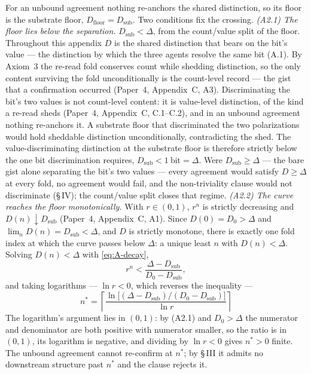 \documentclass[11pt,oneside]{report}
\theoremstyle{definition}
\theoremstyle{remark}
\begin{document}
For an unbound agreement nothing re-anchors the shared distinction, so its floor is the
substrate floor, \ensuremath{D_{\mathrm{floor}} = D_{\mathrm{sub}}}. Two conditions fix
the crossing.
\emph{(A2.1) The floor lies below the separation.} \ensuremath{D_{\mathrm{sub}} <
\Delta}, from the count/value split of the floor. Throughout this appendix
\ensuremath{D} is the shared distinction that bears on the bit's value --- the
distinction by which the three agents resolve the same bit (A.1). By Axiom~3 the
re-read fold conserves count while shedding distinction, so the only content surviving
the fold unconditionally is the count-level record --- the gist that a confirmation
occurred (Paper~4, Appendix~C, A3). Discriminating the bit's two values is not
count-level content: it is value-level distinction, of the kind a re-read sheds
(Paper~4, Appendix~C, C.1--C.2), and in an unbound agreement nothing re-anchors it. A
substrate floor that discriminated the two polarizations would hold sheddable
distinction unconditionally, contradicting the shed. The value-discriminating
distinction at the substrate floor is therefore strictly below the one bit
discrimination requires, \ensuremath{D_{\mathrm{sub}} < 1\ \text{bit} = \Delta}. Were
\ensuremath{D_{\mathrm{sub}} \geq \Delta} --- the bare gist alone separating the bit's
two values --- every agreement would satisfy \ensuremath{D \geq \Delta} at every fold,
no agreement would fail, and the non-triviality clause would not discriminate
(\S\,IV); the count/value split closes that regime.
\emph{(A2.2) The curve reaches the floor monotonically.} With \ensuremath{r \in (0,1)},
\ensuremath{r^{n}} is strictly decreasing and \ensuremath{D(n) \downarrow
D_{\mathrm{sub}}} (Paper~4, Appendix~C, A1). Since \ensuremath{D(0) = D_0 > \Delta} and
\ensuremath{\lim_{n} D(n) = D_{\mathrm{sub}} < \Delta}, and \ensuremath{D} is strictly
monotone, there is exactly one fold index at which the curve passes below
\ensuremath{\Delta}: a unique least \ensuremath{n} with \ensuremath{D(n) < \Delta}.
Solving \ensuremath{D(n) < \Delta} with \eqref{eq:A-decay},
\begin{equation}
r^{n} < \frac{\Delta - D_{\mathrm{sub}}}{D_0 - D_{\mathrm{sub}}},
\end{equation}
and taking logarithms --- \ensuremath{\ln r < 0}, which reverses the inequality ---
\begin{equation}
\boxed{\;n^{*} = \left\lceil
\frac{\ln\!\big[(\Delta - D_{\mathrm{sub}})/(D_0 - D_{\mathrm{sub}})\big]}{\ln r}
\right\rceil\;}
\label{eq:A-nstar}
\end{equation}
The logarithm's argument lies in \ensuremath{(0,1)}: by (A2.1) and
\ensuremath{D_0 > \Delta} the numerator and denominator are both positive with
numerator smaller, so the ratio is in \ensuremath{(0,1)}, its logarithm is negative,
and dividing by \ensuremath{\ln r < 0} gives \ensuremath{n^{*} > 0} finite. The unbound
agreement cannot re-confirm at \ensuremath{n^{*}}; by \S\,III it admits no downstream
structure past \ensuremath{n^{*}} and the clause rejects it.
\end{document}
